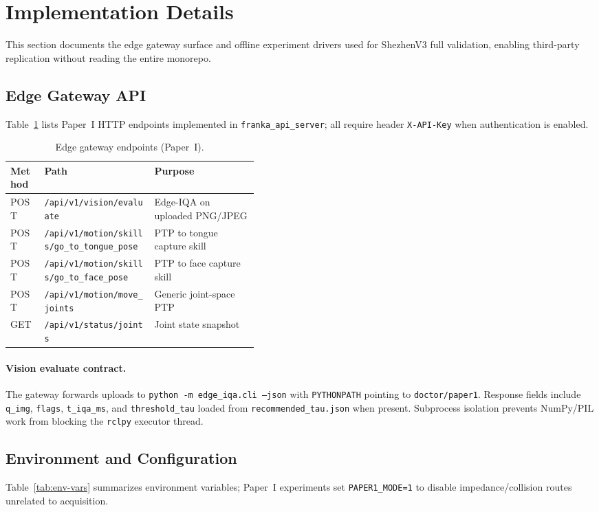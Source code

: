 \section{Implementation Details}
\label{sec:implementation}

This section documents the edge gateway surface and offline experiment drivers used for ShezhenV3 full validation, enabling third-party replication without reading the entire monorepo.

\subsection{Edge Gateway API}
Table~\ref{tab:api-endpoints} lists Paper~I HTTP endpoints implemented in \texttt{franka\_api\_server}; all require header \texttt{X-API-Key} when authentication is enabled.

\begin{table}[t]
\centering
\caption{Edge gateway endpoints (Paper~I).}
\label{tab:api-endpoints}
\small
\begin{tabular}{llp{0.42\linewidth}}
\hline
Method & Path & Purpose \\
\hline
POST & \texttt{/api/v1/vision/evaluate} & Edge-IQA on uploaded PNG/JPEG \\
POST & \texttt{/api/v1/motion/skills/go\_to\_tongue\_pose} & PTP to tongue capture skill \\
POST & \texttt{/api/v1/motion/skills/go\_to\_face\_pose} & PTP to face capture skill \\
POST & \texttt{/api/v1/motion/move\_joints} & Generic joint-space PTP \\
GET & \texttt{/api/v1/status/joints} & Joint state snapshot \\
\hline
\end{tabular}
\end{table}

\paragraph{Vision evaluate contract.}
The gateway forwards uploads to \texttt{python -m edge\_iqa.cli --json} with \texttt{PYTHONPATH} pointing to \texttt{doctor/paper1}.
Response fields include \texttt{q\_img}, \texttt{flags}, \texttt{t\_iqa\_ms}, and \texttt{threshold\_tau} loaded from \texttt{recommended\_tau.json} when present.
Subprocess isolation prevents NumPy/PIL work from blocking the \texttt{rclpy} executor thread.

\subsection{Environment and Configuration}
Table~\ref{tab:env-vars} summarizes environment variables; Paper~I experiments set \texttt{PAPER1\_MODE=1} to disable impedance/collision routes unrelated to acquisition.

